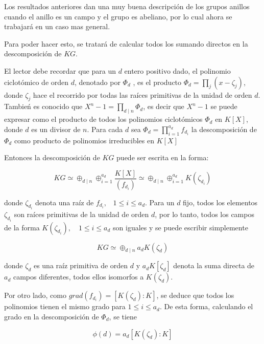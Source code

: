 Los resultados anteriores dan una muy buena descripción de los grupos anillos cuando el anillo es un campo y el grupo es abeliano, por lo cual ahora se trabajará en un caso mas general. 


Para poder hacer esto, se tratará de calcular todos los sumando directos en la descomposición de $KG$.  

El lector debe recordar que para un $d$ entero positivo dado, el polinomio ciclotómico de orden $d$, denotado por $\Phi_d$ , es el producto $\Phi_d = \prod_{j}(x-\zeta_j)$, donde $\zeta_j$ hace el recorrido por todas las raíces primitivas de la unidad de orden $d$. Tambień es conocido que $X^n -1 = \prod_{d\mid n} \Phi_d $, es decir que $X^n -1 $ se puede expresar como el producto de todos los polinomios ciclotómicos $\Phi_d$ en $K[X]$, donde $d$ es un divisor de $n$. Para cada $d$ sea $\Phi_d = \prod_{i=1}^{a_d}f_{d_i}$ la descomposición de $\Phi_d$ como producto de polinomios irreducibles en $K[X]$

Entonces la descomposición de $KG$ puede ser escrita en la forma:

\[ KG \simeq \oplus_{d \mid n} \oplus_{i=1}^{a_d} \frac{K[X]}{(f_{d_i})} \simeq \oplus_{d \mid n} \oplus_{i=1}^{a_d} K(\zeta _{d_i}) \]

donde $\zeta_{d_i}$ denota una raíz de $f_{d_i}  \mbox{,} \quad 1 \leq i \leq a_d $. Para un $d$ fijo, todos los elementos $\zeta_{d_i}$ son raíces primitivas de la unidad de orden $d$, por lo tanto, todos los campos de la forma $K(\zeta_{d_i}), \quad 1\leq i \leq a_d$ son iguales y se puede escribir simplemente 

\[ KG \simeq \oplus_{d \mid n} a_dK(\zeta_d)\]

donde $\zeta_d$ es una raíz primitiva de orden $d$ y $a_dK[\zeta_d]$ denota la suma directa de $a_d$ campos diferentes, todos ellos isomorfos a $K(\zeta_d)$.

Por otro lado, como $grad(f_{d_i}) = [K(\zeta_d):K]$, se deduce que todos los polinomios tienen el mismo grado para $1 \leq i \leq a_d$. De esta forma, calculando el grado en la descomposición de $\Phi_d$, se tiene

\[ \phi(d) = a_d[K(\zeta_d):K] \]

